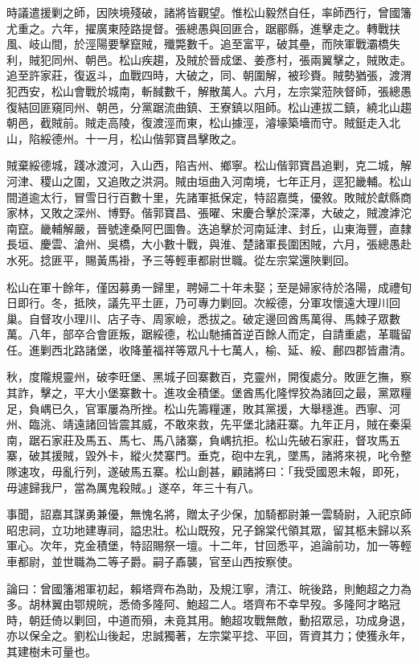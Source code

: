 \begin{pinyinscope}
時議遣援剿之師，因陜境殘破，諸將皆觀望。惟松山毅然自任，率師西行，曾國籓尤重之。六年，擢廣東陸路提督。張總愚與回匪合，踞郿縣，進擊走之。轉戰扶風、岐山間，於涇陽要擊竄賊，殲斃數千。追至富平，破其壘，而陜軍戰灞橋失利，賊犯同州、朝邑。松山疾趨，及賊於晉成堡、姜彥村，張兩翼擊之，賊敗走。追至許家莊，復返斗，血戰四時，大破之，同、朝圍解，被珍賚。賊勢猶張，渡渭犯西安，松山會戰於城南，斬馘數千，解散萬人。六月，左宗棠蒞陜督師，張總愚復結回匪窺同州、朝邑，分黨踞流曲鎮、王寮鎮以阻師。松山連拔二鎮，繞北山趨朝邑，截賊前。賊走高陵，復渡涇而東，松山據涇，濬壕築墻而守。賊鋌走入北山，陷綏德州。十一月，松山偕郭寶昌擊敗之。

賊棄綏德城，踐冰渡河，入山西，陷吉州、鄉寧。松山偕郭寶昌追剿，克二城，解河津、稷山之圍，又追敗之洪洞。賊由垣曲入河南境，七年正月，逕犯畿輔。松山間道逾太行，冒雪日行百數十里，先諸軍抵保定，特詔嘉獎，優敘。敗賊於獻縣商家林，又敗之深州、博野。偕郭寶昌、張曜、宋慶合擊於深澤，大破之，賊渡滹沱南竄。畿輔解嚴，晉號達桑阿巴圖魯。迭追擊於河南延津、封丘，山東海豐，直隸長垣、慶雲、滄州、吳橋，大小數十戰，與淮、楚諸軍長圍困賊，六月，張總愚赴水死。捻匪平，賜黃馬褂，予三等輕車都尉世職。從左宗棠還陜剿回。

松山在軍十餘年，僅因募勇一歸里，聘婦二十年未娶；至是婦家待於洛陽，成禮旬日即行。冬，抵陜，議先平土匪，乃可專力剿回。次綏德，分軍攻懷遠大理川回巢。自督攻小理川、店子寺、周家嶮，悉拔之。破定邊回酋馬萬得、馬棘子眾數萬。八年，部卒合會匪叛，踞綏德，松山馳捕首逆百餘人而定，自請重處，革職留任。進剿西北路諸堡，收降董福祥等眾凡十七萬人，榆、延、綏、鄜四郡皆肅清。

秋，度隴規靈州，破李旺堡、黑城子回寨數百，克靈州，開復處分。敗匪乞撫，察其詐，擊之，平大小堡寨數十。進攻金積堡。堡酋馬化隆悍狡為諸回之最，黨眾糧足，負嵎已久，官軍屢為所挫。松山先籌糧運，敗其黨援，大舉穩進。西寧、河州、臨洮、靖遠諸回皆震其威，不敢來救，先平堡北諸莊寨。九年正月，賊在秦渠南，踞石家莊及馬五、馬七、馬八諸寨，負嵎抗拒。松山先破石家莊，督攻馬五寨，破其援賊，毀外卡，縱火焚寨門。垂克，砲中左乳，墜馬，諸將來視，叱令整隊速攻，毋亂行列，遂破馬五寨。松山創甚，顧諸將曰：「我受國恩未報，即死，毋遽歸我尸，當為厲鬼殺賊。」遂卒，年三十有八。

事聞，詔嘉其謀勇兼優，無愧名將，贈太子少保，加騎都尉兼一雲騎尉，入祀京師昭忠祠，立功地建專祠，謚忠壯。松山既歿，兄子錦棠代領其眾，留其柩未歸以系軍心。次年，克金積堡，特詔賜祭一壇。十二年，甘回悉平，追論前功，加一等輕車都尉，並世職為二等子爵。嗣子鼒襲，官至山西按察使。

論曰：曾國籓湘軍初起，賴塔齊布為助，及規江寧，清江、皖後路，則鮑超之力為多。胡林翼由鄂規皖，悉倚多隆阿、鮑超二人。塔齊布不幸早歿。多隆阿才略冠時，朝廷倚以剿回，中道而殞，未竟其用。鮑超攻戰無敵，動招眾忌，功成身退，亦以保全之。劉松山後起，忠誠獨著，左宗棠平捻、平回，胥資其力；使獲永年，其建樹未可量也。


\end{pinyinscope}